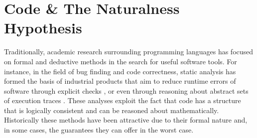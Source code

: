 \section{Code \& The Naturalness Hypothesis} %
\label{sec:code_and_natural_language}





Traditionally, academic research surrounding programming languages has focused on formal and deductive methods in the search for useful software tools.
For instance, in the field of bug finding and code correctness, static analysis has formed the basis of industrial products that aim to reduce runtime errors of software through explicit checks \cite{okada_combination_2007}, or even through reasoning about abstract sets of execution traces
\cite{bessey_few_2010}. 
These analyses exploit the fact that code has a structure that is logically consistent and can be reasoned about mathematically.
Historically these methods have been attractive due to their formal nature and, in some cases, the guarantees they can offer in the worst case.

